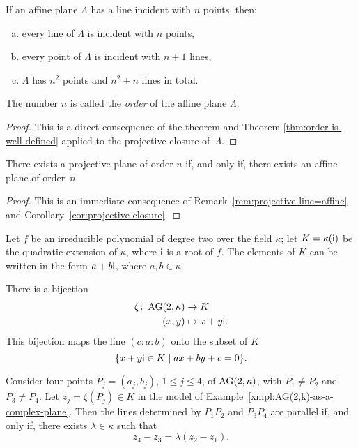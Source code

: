 \begin{cor}\label{cor:projective-closure}
    If an affine plane\/ $\Lambda$ has a line incident with\/ $n$ points, then:
    \begin{enumerate}[a), font=\upshape]
        \item every line of\/ $\Lambda$ is incident with\/ $n$ points,
        \item every point of\/ $\Lambda$ is incident with\/ $n + 1$ lines,
        \item $\Lambda$ has\/ $n^2$ points and\/ $n^2 + n$ lines in total.
    \end{enumerate}
    The number\/ $n$ is called the \textsl{order} of the affine plane\/ $\Lambda$.
\end{cor}

\begin{proof}
    This is a direct consequence of the theorem and Theorem \ref{thm:order-is-well-defined} applied to the projective closure of~$\Lambda$.
\end{proof}

\begin{thm}
    There exists a projective plane of order\/ $n$ if, and only if, there exists an affine plane of order\/~$n$.
\end{thm}

\begin{proof}
    This is an immediate consequence of Remark~\ref{rem:projective-line=affine} and Corollary~\ref{cor:projective-closure}.
    
\end{proof}

\begin{xmpl}\label{xmpl:AG(2,k)-as-a-complex-plane}
    Let $f$ be an irreducible polynomial of degree two over the field $\kappa$; let $K = \kappa(\mathsf{i})$ be the quadratic extension of $\kappa$, where $\mathsf{i}$ is a root of $f$.  
    The elements of $K$ can be written in the form $a + b\mathsf{i}$, where $a, b \in \kappa$.
    
    There is a bijection
    \begin{align*}
        \zeta\colon\operatorname{AG}(2,\kappa)&\to K\\
        (x,y)&\mapsto x+y\mathsf{i}.
    \end{align*}
    This bijection maps the line $(c:a:b)$ onto the subset of $K$
    \[
        \{x+y\mathsf{i} \in K\mid ax+by+c= 0\}.
    \]  
\end{xmpl}


\begin{thm}
    Consider four points\/ $P_j = (a_j, b_j)$, $1\le j\le 4$, of\/ $\operatorname{AG}(2, \kappa)$, with $P_1\ne P_2$ and $P_3\ne P_4$. Let\/ $z_j=\zeta(P_j) \in K$ in the model of\/ {\upshape Example~\ref{xmpl:AG(2,k)-as-a-complex-plane}}. Then the lines determined by\/ $P_1P_2$ and\/ $P_3P_4$ are parallel if, and only if, there exists\/ $\lambda \in \kappa$ such that
    \[
        z_4 - z_3 = \lambda(z_2 - z_1).
    \]
\end{thm}

